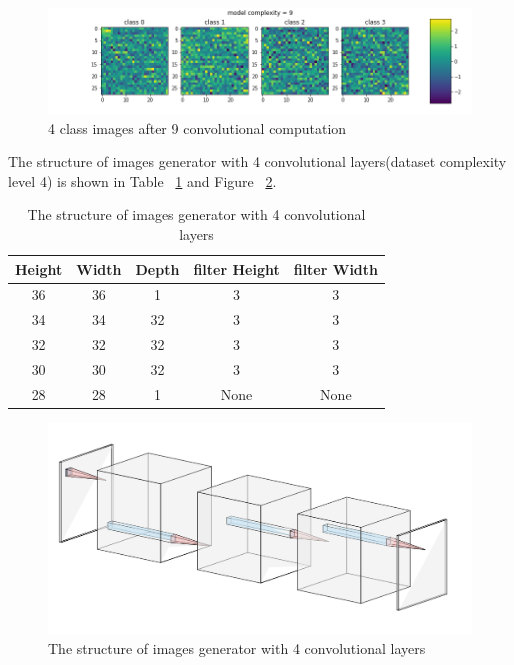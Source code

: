 \documentclass{article}
\begin{document}
\begin{figure}[h]
    \centering
    \includegraphics[width=1\linewidth]{demo-9.png}
    \caption{\small 4 class images after 9 convolutional computation}
    \label{fig:most_complex_image}
\end{figure}

The structure of images generator with 4 convolutional layers(dataset complexity level 4) is shown in Table ~\ref{table:generator_structure} and Figure ~\ref{fig:generator_structure}.

\begin{table}
\begin{center}
\begin{tabular}{ |c|c|c|c|c| } 
\hline
Height & Width & Depth & filter Height & filter Width \\
\hline
36 & 36 & 1 & 3 & 3 \\ 
\hline
34 & 34 & 32 & 3 & 3 \\ 
\hline
32 & 32 & 32 & 3 & 3 \\ 
\hline
30 & 30 & 32 & 3 & 3 \\ 
\hline
28 & 28 & 1 & None & None \\ 
\hline
\end{tabular}
\end{center}
\caption{The structure of images generator with 4 convolutional layers}
\label{table:generator_structure}
\end{table}

\begin{figure}[h]
    \centering
    \includegraphics[width=1\linewidth]{generator_structure.png}
    \caption{\small The structure of images generator with 4 convolutional layers}
    \label{fig:generator_structure}
\end{figure}
\end{document}
